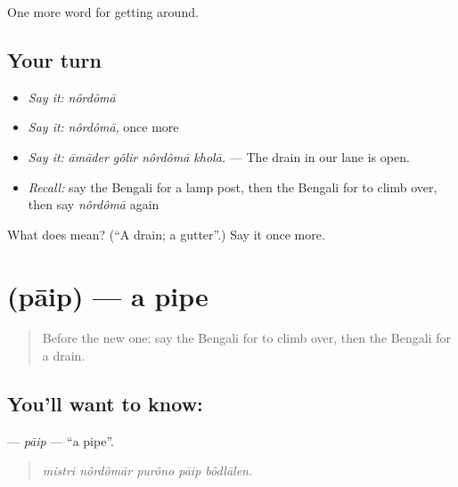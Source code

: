 \begin{grammarlens}[title={What you've built}]
One more word for getting around.
\end{grammarlens}

\subsection*{Your turn}
\begin{itemize}
\raggedright
  \item \emph{Say it:} \emph{nôrdômā}
  \item \emph{Say it:} \emph{nôrdômā}, once more
  \item \emph{Say it:} \emph{āmāder gôlir nôrdômā kholā.} — The drain in our lane is open.
  \item \emph{Recall:} say the Bengali for a lamp post, then the Bengali for to climb over, then say \emph{nôrdômā} again
\end{itemize}

\begin{tcolorbox}[breakable,colback=teal!4,colframe=teal!35!black,title={Before you move on}]
What does  mean? (\textquotedblleft{}A drain; a gutter\textquotedblright{}.) Say it once more.
\end{tcolorbox}
\section[\texorpdfstring{\bn{পাইপ} (pāip)}{পাইপ (pāip)}]{ (pāip) — a pipe}

\label{lesson:BN-C413-paip}



\begin{quote}
Before the new one: say the Bengali for to climb over, then the Bengali for a drain.
\end{quote}

\subsection*{You'll want to know: }
\textbf{} — \emph{pāip} — \textquotedblleft{}a pipe\textquotedblright{}.

\begin{quote}
    
\end{quote}

\begin{quote}
\emph{mistri nôrdômār purôno pāip bôdlālen.}
\end{quote}

